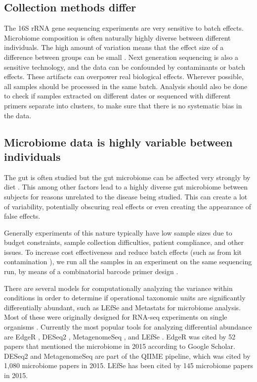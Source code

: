 \subsection{Collection methods differ}
The 16S rRNA gene sequencing experiments are very sensitive to batch effects. Microbiome composition is often naturally highly diverse between different individuals. The high amount of variation means that the effect size of a difference between groups can be small \cite{fernandes2014unifying}. Next generation sequencing is also a sensitive technology, and the data can be confounded by contaminants \cite{salter2014reagent} or batch effects. These artifacts can overpower real biological effects. Wherever possible, all samples should be processed in the same batch. Analysis should also be done to check if samples extracted on different dates or sequenced with different primers separate into clusters, to make sure that there is no systematic bias in the data.

\subsection{Microbiome data is highly variable between individuals}
The gut is often studied but the gut microbiome can be affected very strongly by diet \cite{turnbaugh2009effect}. This among other factors lead to a highly diverse gut microbiome between subjects for reasons unrelated to the disease being studied. This can create a lot of variability, potentially obscuring real effects or even creating the appearance of false effects.

Generally experiments of this nature typically have low sample sizes due to budget constraints, sample collection difficulties, patient compliance, and other issues. To increase cost effectiveness and reduce batch effects (such as from kit contamination \cite{salter2014reagent}), we run all the samples in an experiment on the same sequencing run, by means of a combinatorial barcode primer design \cite{gloor2010microbiome}.

There are several models for computationally analyzing the variance within conditions in order to determine if operational taxonomic units are significantly differentially abundant, such as LEfSe \cite{segata2011metagenomic} and Metastats \cite{paulson2011metastats} for microbiome analysis. Most of these were originally designed for RNA-seq experiments on single organisms \cite{pachter2011models}. Currently the most popular tools for analyzing differential abundance are EdgeR \cite{robinson2010edger}, DESeq2 \cite{love2014moderated}, MetagenomeSeq \cite{paulson2014metagenomeseq}, and LEfSe \cite{segata2011metagenomic}. EdgeR was cited by 52 papers that mentioned the microbiome in 2015 according to Google Scholar. DESeq2 and MetagenomeSeq are part of the QIIME pipeline, which was cited by 1,080 microbiome papers in 2015. LEfSe has been cited by 145 microbiome papers in 2015.


